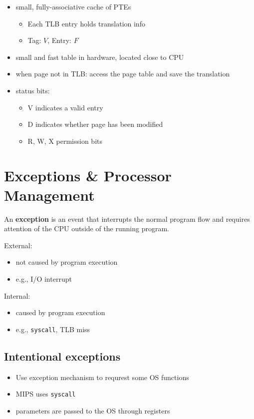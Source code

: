 \documentclass{article}
\newcommand{\T}[1]{\texttt{#1}}
\begin{document}
\begin{itemize}
	\item small, fully-associative cache of PTEs \begin{itemize}
		\item Each TLB entry holds translation info
		\item Tag: $V$, Entry: $F$
	\end{itemize}
	\item small and fast table in hardware, located close to CPU
	\item when page not in TLB: access the page table and save the translation
	\item status bits: \begin{itemize}
		\item V indicates a valid entry
		\item D indicates whether page has been modified
		\item R, W, X permission bits
	\end{itemize} 
\end{itemize}

\section{Exceptions \& Processor Management}

\begin{definition}
	An \textbf{exception} is an event that interrupts the normal program flow
	and requires attention of the CPU outside of the running program.
\end{definition}

External:
\begin{itemize}
	\item not caused by program execution
	\item e.g., I/O interrupt
\end{itemize}

Internal:
\begin{itemize}
	\item caused by program execution
	\item e.g., \T{syscall}, TLB miss
\end{itemize}

\subsection{Intentional exceptions}

\begin{itemize}
	\item Use exception mechanism to requrest some OS functions
	\item MIPS uses \T{syscall}
	\item parameters are passed to the OS through registers
\end{itemize}
\end{document}

